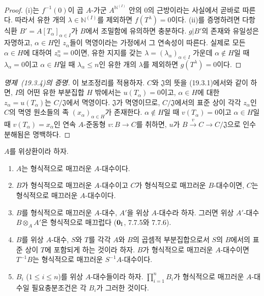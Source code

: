 
\begin{proof}
(i)는 $f^{-1}(0)$이 곱 $A$-가군 $A^{\mathbb{N}^{(I)}}$ 안의 $0$의
근방이라는 사실에서 곧바로 따른다. 따라서 유한 개의
$\lambda\in\mathbb{N}^{(I)}$를 제외하면 $f(T^\lambda)=0$이다.
(ii)를 증명하려면 다항식환 $B'=A[T_\alpha]_{\alpha\in I}$가 $B$에서
조밀함에 유의하면 충분하다. $g|B'$의 존재와 유일성은 자명하고,
$\alpha\in H$인 $z_\alpha$들이 멱영이라는 가정에서 그 연속성이
따른다. 실제로 모든 $\alpha\in H$에 대하여 $z_\alpha^n=0$이면,
유한 지지를 갖는 $\lambda=(\lambda_\alpha)_{\alpha\in I}$ 가운데
$\alpha\notin H$일 때 $\lambda_\alpha=0$이고 $\alpha\in H$일 때
$\lambda_\alpha\leq n$인 유한 개의 $\lambda$를 제외하면
$g(T^\lambda)=0$이다.
\end{proof}

\begin{proof}[명제~{\rm(19.3.4)}의 증명]
이 보조정리를 적용하자. $C$와 $\mathfrak J$의 뜻을 (19.3.1)에서와
같이 하면, $I$의 어떤 유한 부분집합 $H$ 밖에서는
$u(T_\alpha)=0$이고, $\alpha\in H$에 대한
$z_\alpha=u(T_\alpha)$는 $C/\mathfrak J$에서 멱영이다.
$\mathfrak J$가 멱영이므로, $C/\mathfrak J$에서의 표준 상이 각각
$z_\alpha$인 $C$의 멱영 원소들의 족
$(x_\alpha)_{\alpha\in H}$가 존재한다. $\alpha\notin H$일 때
$v(T_\alpha)=0$이고 $\alpha\in H$일 때
$v(T_\alpha)=x_\alpha$인 연속 $A$-준동형 $v:B\to C$를 취하면,
$u$가 $B\xrightarrow{v}C\to C/\mathfrak J$으로 인수분해됨은 명백하다.
\end{proof}

\begin{proposition}[19.3.5]
\label{0.19.3.5-fr}
$A$를 위상환이라 하자.
\begin{enumerate}
  \item[(i)] $A$는 형식적으로 매끄러운 $A$-대수이다.
  \item[(ii)] $B$가 형식적으로 매끄러운 $A$-대수이고 $C$가 형식적으로
  매끄러운 $B$-대수이면, $C$는 형식적으로 매끄러운 $A$-대수이다.
  \item[(iii)] $B$를 형식적으로 매끄러운 $A$-대수, $A'$을 위상
  $A$-대수라 하자. 그러면 위상 $A'$-대수 $B\otimes_A A'$은
  형식적으로 매끄럽다 ($\mathbf 0_{\rm I}$, 7.7.5와 7.7.6).
  \item[(iv)] $B$를 위상 $A$-대수, $S$와 $T$를 각각 $A$와 $B$의
  곱셈적 부분집합으로서 $S$의 $B$에서의 표준 상이 $T$에 포함되게
  하는 것이라 하자. $B$가 형식적으로 매끄러운 $A$-대수이면
  $T^{-1}B$는 형식적으로 매끄러운 $S^{-1}A$-대수이다.
  \item[(v)] $B_i$ ($1\leq i\leq n$)를 위상 $A$-대수들이라 하자.
  $\prod_{i=1}^n B_i$가 형식적으로 매끄러운 $A$-대수일 필요충분조건은
  각 $B_i$가 그러한 것이다.
\end{enumerate}
\end{proposition}

